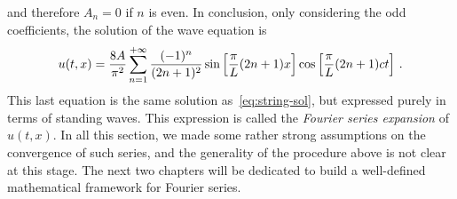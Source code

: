 and therefore $A_n=0$ if $n$ is even. In conclusion, only considering the odd
coefficients, the solution of the wave equation is
\begin{equation}
	u(t,x)=\frac{8A}{\pi^2}\sum_{n=1}^{+\infty}\frac{(-1)^n}{(2n+1)^2}
	\sin\left[\frac{\pi}{L}(2n+1)x\right]\cos\left[\frac{\pi}{L}(2n+1)ct\right]\,.
	\label{eq:string-fourier}
\end{equation}
This last equation is the same solution as~\cref{eq:string-sol}, but expressed purely in
terms of standing waves. This expression is called the \emph{Fourier series expansion} of
$u(t,x)$. In all this section, we made some rather strong assumptions on the convergence
of such series, and the generality of the procedure above is not clear at this stage. The
next two chapters will be dedicated to build a well-defined mathematical framework for
Fourier series.


